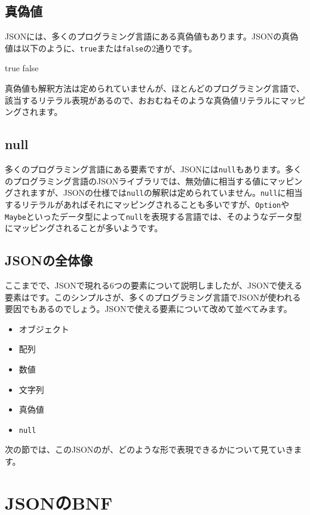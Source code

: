 \subsection{真偽値}

JSONには、多くのプログラミング言語にある真偽値もあります。JSONの真偽値は以下のように、\texttt{true}または\texttt{false}の2通りです。

\begin{codescreen}{}
true
false
\end{codescreen}


真偽値も解釈方法は定められていませんが、ほとんどのプログラミング言語で、該当するリテラル表現があるので、おおむねそのような真偽値リテラルにマッピングされます。

\subsection{null}

多くのプログラミング言語にある要素ですが、JSONには\texttt{null}もあります。多くのプログラミング言語のJSONライブラリでは、無効値に相当する値にマッピングされますが、JSONの仕様では\texttt{null}の解釈は定められていません。\texttt{null}に相当するリテラルがあればそれにマッピングされることも多いですが、\texttt{Option}や\texttt{Maybe}といったデータ型によって\texttt{null}を表現する言語では、そのようなデータ型にマッピングされることが多いようです。

\subsection{JSONの全体像}

ここまでで、JSONで現れる6つの要素について説明しましたが、JSONで使える要素はです。このシンプルさが、多くのプログラミング言語でJSONが使われる要因でもあるのでしょう。JSONで使える要素について改めて並べてみます。

\begin{itemize}
\item
  オブジェクト
\item
  配列
\item
  数値
\item
  文字列
\item
  真偽値
\item
  \texttt{null}
\end{itemize}

次の節では、このJSONのが、どのような形で表現できるかについて見ていきます。

\section{JSONのBNF}

